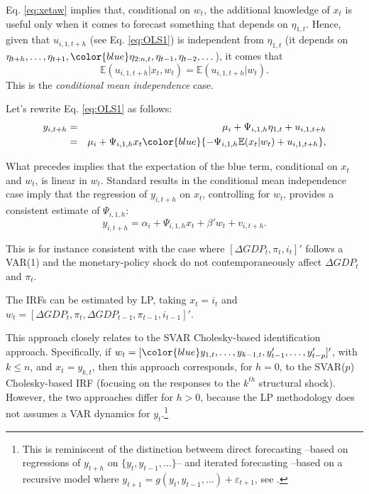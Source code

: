 \documentclass[
  12pt,
]{book}
\theoremstyle{definition}
\theoremstyle{definition}
\theoremstyle{definition}
\theoremstyle{definition}
\theoremstyle{remark}
\begin{document}
Eq. \eqref{eq:xetaw} implies that, conditional on \(w_t\), the additional knowledge of \(x_t\) is useful only when it comes to forecast something that depends on \(\eta_{1,t}\). Hence, given that \(u_{i,1,t+h}\) (see Eq. \eqref{eq:OLS1}) is independent from \(\eta_{1,t}\) (it depends on \(\eta_{t+h},\dots,\eta_{t+1},{\color{blue}\eta_{2:n,t}},\eta_{t-1},\eta_{t-2},\dots\)), it comes that
\[
\mathbb{E}(u_{i,1,t+h}|x_t,w_t)= \mathbb{E}(u_{i,1,t+h}|w_t).
\]
This is the \emph{conditional mean independence} case.

Let's rewrite Eq. \eqref{eq:OLS1} as follows:
\begin{eqnarray*}
y_{i,t+h} &=& \mu_i + \Psi_{i,1,h}\eta_{1,t} + u_{i,1,t+h}\\
&=&  \mu_i + \Psi_{i,1,h}x_t  \color{blue}{-\Psi_{i,1,h}\mathbb{E}(x_t|w_t) + u_{i,1,t+h}},
\end{eqnarray*}

What precedes implies that the expectation of the blue term, conditional on \(x_t\) and \(w_t\), is linear in \(w_t\). Standard results in the conditional mean independence case imply that the regression of \(y_{i,t+h}\) on \(x_t\), controlling for \(w_t\), provides a consistent estimate of \(\Psi_{i,1,h}\):
\begin{equation}
y_{i,t+h} = \alpha_i + \Psi_{i,1,h}x_t + \beta'w_t + v_{i,t+h}.
\end{equation}

This is for instance consistent with the case where \([\Delta GDP_t, \pi_t,i_t]'\) follows a VAR(1) and the monetary-policy shock do not contemporaneously affect \(\Delta GDP_t\) and \(\pi_t\).

The IRFs can be estimated by LP, taking \(x_t = i_t\) and \(w_t = [\Delta GDP_t,\pi_t,\Delta GDP_{t-1}, \pi_{t-1},i_{t-1}]'\).

This approach closely relates to the SVAR Cholesky-based identification approach. Specifically, if \(w_t = [{\color{blue}y_{1,t},\dots,y_{k-1,t}}, y_{t-1}',\dots,y_{t-p}']'\), with \(k\le n\), and \(x_t = y_{k,t}\), then this approach corresponds, for \(h=0\), to the SVAR(\(p\)) Cholesky-based IRF (focusing on the responses to the \(k^{th}\) structural shock). However, the two approaches differ for \(h>0\), because the LP methodology does not assumes a VAR dynamics for \(y_t\).\footnote{This is reminiscent of the distinction betweem direct forecasting --based on regressions of \(y_{t+h}\) on \(\{y_t,y_{t-1},\dots\}\)-- and iterated forecasting --based on a recursive model where \(y_{t+1} = g(y_t,y_{t-1},\dots)+\varepsilon_{t+1}\), see \citet{Marcellino_et_al_2006}.}
\end{document}
